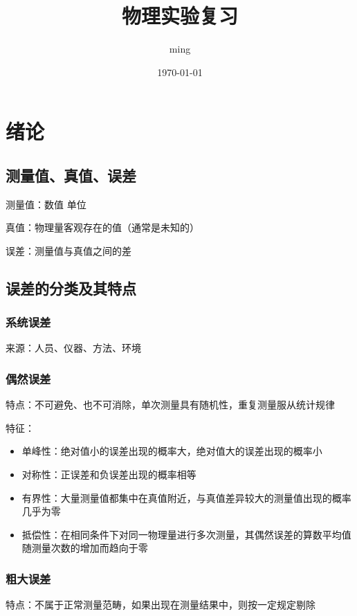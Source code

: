 \documentclass{article}
\title{物理实验复习}
\author{ming}
\date{\today}
\begin{document}
\maketitle

\section{绪论}

\subsection{测量值、真值、误差}
测量值：数值 单位

真值：物理量客观存在的值（通常是未知的）

误差：测量值与真值之间的差

\subsection{误差的分类及其特点}

\subsubsection{系统误差}

来源：人员、仪器、方法、环境

\subsubsection{偶然误差}

特点：不可避免、也不可消除，单次测量具有随机性，重复测量服从统计规律

特征：
\begin{itemize}
    \item 单峰性：绝对值小的误差出现的概率大，绝对值大的误差出现的概率小
    \item 对称性：正误差和负误差出现的概率相等
    \item 有界性：大量测量值都集中在真值附近，与真值差异较大的测量值出现的概率几乎为零
    \item 抵偿性：在相同条件下对同一物理量进行多次测量，其偶然误差的算数平均值随测量次数的增加而趋向于零
\end{itemize}


\subsubsection{粗大误差}

特点：不属于正常测量范畴，如果出现在测量结果中，则按一定规定剔除
\end{document}
